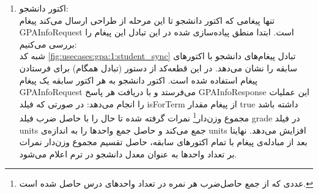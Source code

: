 \begin{enumerate}
\item اکتور دانشجو:\\
تنها پیغامی که اکتور دانشجو تا این مرحله از طراحی ارسال می‌کند پیغام GPAInfoRequest است. ابتدا منطق پیاده‌سازی شده در این تبادل این پیغام را بررسی ‌می‌کنیم:\\
 شبه کد \ref{fig:usecases:gpa:1:student_sync} تبادل پیغام‌های دانشجو با اکتور‌های سابقه را نشان می‌دهد. در این قطعه‌کد از دستور  (تبادل همگام) برای فرستادن پیغام استفاده شده است. اکتور دانشجو به هر اکتور سابقه یک پیغام GPAInfoRequest می‌فرستد و با دریافت هر پاسخ GPAInfoResponse این عملیات را انجام می‌دهد:
در صورتی که فیلد isForTerm از پیغام مقدار true داشته باشد مجموع وزن‌دار\footnote{عددی که از جمع حاصل‌ضرب هر نمره در تعداد واحدهای درس حاصل شده است.} نمرات گرفته شده تا حال را با حاصل ضرب فیلد grade در فیلد units جمع می‌کند و حاصل جمع واحد‌ها را به اندازه‌ی units افزایش می‌دهد. نهایتا بعد از مبادله‌ی پیغام با تمام اکتور‌های سابقه، حاصل تقسیم  مجموع وزن‌دار نمرات بر تعداد واحد‌ها به عنوان معدل دانشجو در ترم اعلام می‌شود.


\end{enumerate}
